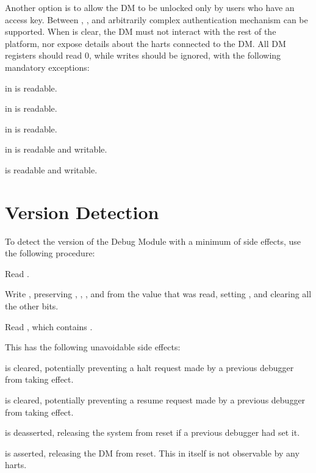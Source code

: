 Another option is to allow the DM to be unlocked only by users who have an
access key. Between \FdmDmstatusAuthenticated, \FdmDmstatusAuthbusy, and \RdmAuthdata arbitrarily
complex authentication mechanism can be supported.  When \FdmDmstatusAuthenticated is
clear, the DM must not interact with the rest of the platform, nor expose
details about the harts connected to the DM. All DM registers should read 0,
while writes should be ignored, with the following mandatory exceptions:
\begin{steps}{}
    \item \FdmDmstatusAuthenticated in \RdmDmstatus is readable.
    \item \FdmDmstatusAuthbusy in \RdmDmstatus is readable.
    \item \FdmDmstatusVersion in \RdmDmstatus is readable.
    \item \FdmDmcontrolDmactive in \RdmDmcontrol is readable and writable.
    \item \RdmAuthdata is readable and writable.
\end{steps}

\section{Version Detection}

\begin{steps}{To detect the version of the Debug Module with a minimum of side
    effects, use the following procedure:}
    \item Read \RdmDmcontrol.
    \item Write \RdmDmcontrol, preserving \FdmDmcontrolHartreset, \FdmDmcontrolHasel, \FdmDmcontrolHartsello, and
        \FdmDmcontrolHartselhi from the value that was read, setting \FdmDmcontrolDmactive, and
        clearing all the other bits.
    \item Read \RdmDmstatus, which contains \FdmDmstatusVersion.
\end{steps}

\begin{steps}{This has the following unavoidable side effects:}
    \item \FdmDmcontrolHaltreq is cleared, potentially preventing a halt request made by a
        previous debugger from taking effect.
    \item \FdmDmcontrolResumereq is cleared, potentially preventing a resume request made
        by a previous debugger from taking effect.
    \item \FdmDmcontrolNdmreset is deasserted, releasing the system from reset if a
        previous debugger had set it.
    \item \FdmDmcontrolDmactive is asserted, releasing the DM from reset. This in itself
        is not observable by any harts.
\end{steps}

